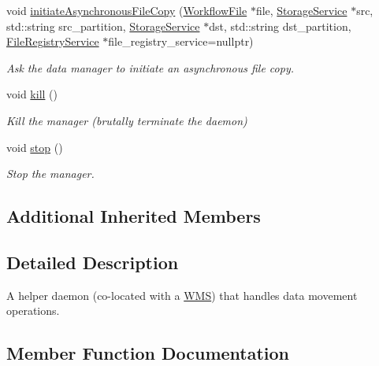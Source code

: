\begin{DoxyCompactItemize}
void \hyperlink{classwrench_1_1_data_movement_manager_a87d7d38e2d45b6024789feac0213d0b2}{initiate\+Asynchronous\+File\+Copy} (\hyperlink{classwrench_1_1_workflow_file}{Workflow\+File} $\ast$file, \hyperlink{classwrench_1_1_storage_service}{Storage\+Service} $\ast$src, std\+::string src\+\_\+partition, \hyperlink{classwrench_1_1_storage_service}{Storage\+Service} $\ast$dst, std\+::string dst\+\_\+partition, \hyperlink{classwrench_1_1_file_registry_service}{File\+Registry\+Service} $\ast$file\+\_\+registry\+\_\+service=nullptr)
\begin{DoxyCompactList}\small\item\em Ask the data manager to initiate an asynchronous file copy. \end{DoxyCompactList}\item 
\mbox{\label{classwrench_1_1_data_movement_manager_a231a54a5b09f83f8e6e9681cc3134864}} 
void \hyperlink{classwrench_1_1_data_movement_manager_a231a54a5b09f83f8e6e9681cc3134864}{kill} ()
\begin{DoxyCompactList}\small\item\em Kill the manager (brutally terminate the daemon) \end{DoxyCompactList}\item 
void \hyperlink{classwrench_1_1_data_movement_manager_a72fc97280a6f1f475e168c1f71ec5f70}{stop} ()
\begin{DoxyCompactList}\small\item\em Stop the manager. \end{DoxyCompactList}\end{DoxyCompactItemize}
\subsection*{Additional Inherited Members}


\subsection{Detailed Description}
A helper daemon (co-\/located with a \hyperlink{classwrench_1_1_w_m_s}{W\+MS}) that handles data movement operations. 

\subsection{Member Function Documentation}
\mbox{\label{classwrench_1_1_data_movement_manager_a815bf4ed2a32b39c0e46a6f5a3c10e51}} 
